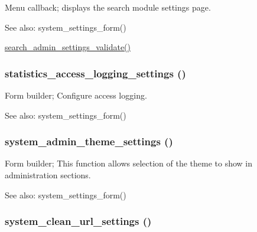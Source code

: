 Menu callback; displays the search module settings page.

\begin{Desc}
\item[See also:]system\_\-settings\_\-form() 

\hyperlink{search_8admin_8inc_c02dbfc93e16ceefc020a119da393584}{search\_\-admin\_\-settings\_\-validate()} \end{Desc}
\hypertarget{group__forms_g78aa8d75d57df6385e2c3c24697ce2a9}{
\subsubsection[{statistics\_\-access\_\-logging\_\-settings}]{\setlength{\rightskip}{0pt plus 5cm}statistics\_\-access\_\-logging\_\-settings ()}}
\label{group__forms_g78aa8d75d57df6385e2c3c24697ce2a9}


Form builder; Configure access logging.

\begin{Desc}
\item[See also:]system\_\-settings\_\-form() \end{Desc}
\hypertarget{group__forms_g1dd7e9d8accd39dc5991233d9d1b8467}{
\subsubsection[{system\_\-admin\_\-theme\_\-settings}]{\setlength{\rightskip}{0pt plus 5cm}system\_\-admin\_\-theme\_\-settings ()}}
\label{group__forms_g1dd7e9d8accd39dc5991233d9d1b8467}


Form builder; This function allows selection of the theme to show in administration sections.

\begin{Desc}
\item[See also:]system\_\-settings\_\-form() \end{Desc}
\hypertarget{group__forms_g39fa3ba9127e8c9a25343c06cd9a3f1c}{
\subsubsection[{system\_\-clean\_\-url\_\-settings}]{\setlength{\rightskip}{0pt plus 5cm}system\_\-clean\_\-url\_\-settings ()}}
\label{group__forms_g39fa3ba9127e8c9a25343c06cd9a3f1c}


